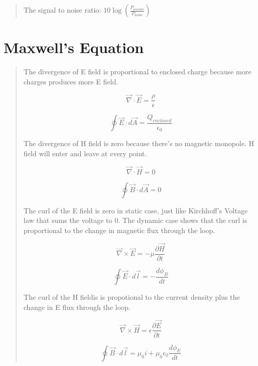 \documentclass{article} %
\begin{document}
\begin{quote}
    The signal to noise ratio: $10 \log\left(\frac{P_{\text{receive}}}{P_{\text{noise}}}\right)$
\end{quote}

\section{Maxwell's Equation}
\begin{quote}

    The divergence of E field is proportional to enclosed charge because more charges produces more E field.

    $$\vec{\nabla} \cdot \vec{E} = \frac{\rho}{\epsilon}$$

    $$\oint \vec{E} \cdot d\vec{A} = \frac{Q_{enclosed}}{\epsilon_0}$$


    The divergence of H field is zero because there's no magnetic monopole. H field will enter and leave at every point.

    $$\vec{\nabla} \cdot \vec{H} = 0$$

    $$\oint \vec{B} \cdot d\vec{A} = 0$$

    The curl of the E field is zero in static case, just like Kirchhoff's Voltage law that sums the voltage to 0. The dynamic case shows that the curl is proportional to the change in magnetic flux through the loop.

    $$\vec{\nabla} \times \vec{E} = -\mu \frac{\partial \vec{H}}{\partial t}$$

    $$\oint \vec{E} \cdot d\vec{l} = -\frac{d\phi_B}{dt}$$

    The curl of the H fieldis is propotional to the current density plus the change in E flux through the loop.

    $$\vec{\nabla} \times \vec{H} = \epsilon \frac{\partial \vec{E}}{\partial t}$$

    $$\oint \vec{B} \cdot d\vec{l} = \mu_0 i + \mu_0 \epsilon_0 \frac{d \phi_E}{dt}$$
\end{quote}
\end{document}
